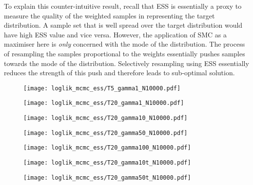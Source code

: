 To explain this counter-intuitive result, recall that ESS is essentially a proxy to measure the quality of the weighted samples in representing the target distribution. A sample set that is well spread over the target distribution would have high ESS value and vice versa. However, the application of SMC as a maximiser here is \emph{only} concerned with the mode of the distribution. The process of resampling the samples proportional to the weights essentially pushes samples towards the mode of the distribution. Selectively resampling using ESS essentially reduces the strength of this push and therefore leads to sub-optimal solution.

\begin{figure}[!thbp]
    \centering
    \begin{minipage}{.5\textwidth}
        \centering
        \texttt{[image: loglik\_mcmc\_ess/T5\_gamma1\_N10000.pdf]}
      
    \end{minipage}%
    \begin{minipage}{0.5\textwidth}
        \centering
        \texttt{[image: loglik\_mcmc\_ess/T20\_gamma1\_N10000.pdf]}
      
    \end{minipage}
    \begin{minipage}{0.5\textwidth}
        \centering
        \texttt{[image: loglik\_mcmc\_ess/T20\_gamma10\_N10000.pdf]}
      
    \end{minipage}%
    \begin{minipage}{0.5\textwidth}
        \centering
        \texttt{[image: loglik\_mcmc\_ess/T20\_gamma50\_N10000.pdf]}
      
    \end{minipage}
    \begin{minipage}{0.5\textwidth}
        \centering
        \texttt{[image: loglik\_mcmc\_ess/T20\_gamma100\_N10000.pdf]}
      
    \end{minipage}%
    \begin{minipage}{0.5\textwidth}
        \centering
        \texttt{[image: loglik\_mcmc\_ess/T20\_gamma10t\_N10000.pdf]}
      
    \end{minipage}
    \begin{minipage}{0.5\textwidth}
        \centering
        \texttt{[image: loglik\_mcmc\_ess/T20\_gamma50t\_N10000.pdf]}
      

\end{minipage}
\end{figure}
